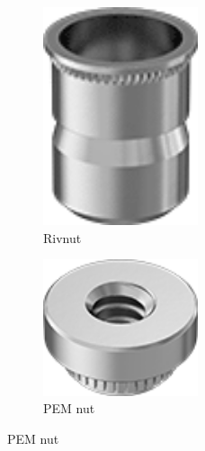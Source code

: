 \documentclass[10pt,letterpaper]{book}
\begin{document}
\begin{figure}[H]
\begin{subfigure}[b]{.24\linewidth}
			\includegraphics[width=0.5\textwidth]{imgs/rivnut.png}
			\caption{Rivnut}
		\end{subfigure}\begin{subfigure}[b]{.24\linewidth}
			\includegraphics[width=0.5\textwidth]{imgs/pemnut.png}
			\caption{PEM nut}
		\end{subfigure}
		

\end{figure}
\end{document}
